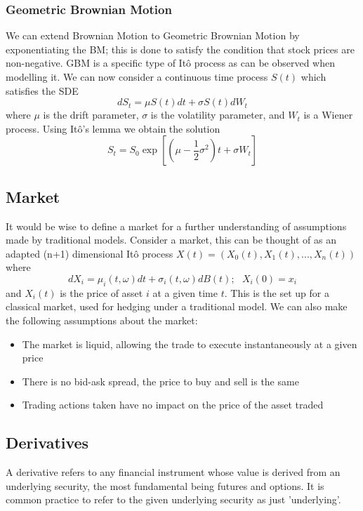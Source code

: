 \documentclass[12pt]{article}
\numberwithin{equation}{section}
\begin{document}
\subsubsection{Geometric Brownian Motion}
We can extend Brownian Motion to Geometric Brownian Motion by exponentiating the BM; 
this is done to satisfy the condition that stock prices are non-negative\autocite{brownianmotion}. GBM 
is a specific type of It\^{o} process as can be observed when modelling it.
We can now consider a continuous time process $S(t)$ which satisfies the SDE
\begin{equation}
  dS_t = \mu S(t)dt + \sigma S(t)dW_t 
\end{equation}
where $\mu$ is the drift parameter, $\sigma$ is the volatility parameter, and 
$W_t$ is a Wiener process. Using It\^{o}'s lemma we obtain the solution
\begin{equation}
  S_t = S_0 \exp \left[(\mu-\frac{1}{2}\sigma^2) t + \sigma W_t\right]
\end{equation}

\subsection{Market}
It would be wise to define a market for a further understanding of assumptions 
made by traditional models. 
Consider a market, this can be thought of as an adapted (n+1) dimensional 
It\^{o} process 
$X(t) = (X_0(t), X_1(t),...,X_n(t))$
where 
\begin{equation}
dX_i = \mu_i(t,\omega)dt+\sigma_i(t,\omega)dB(t);\hspace{8pt}X_i(0)=x_i 
\end{equation}
and $X_i(t)$ is the price of asset $i$ at a given time $t$. This is the set up 
for a classical market, used for hedging under a traditional model\autocite{wallace}.
We can also make the following assumptions about the market:
\begin{itemize}
  \item The market is liquid, allowing the trade to execute instantaneously at a 
    given price
  \item There is no bid-ask spread, the price to buy and sell is the same 
  \item Trading actions taken have no impact on the price of the asset traded 
\end{itemize}


\subsection{Derivatives}
A derivative refers to any financial instrument whose value is derived from an 
underlying security, the most fundamental being futures and options. It is common 
practice to refer to the given underlying security as just 'underlying'.
\end{document}
